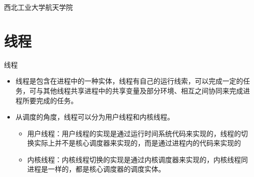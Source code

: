 

\def\lecturename{嵌入式技术}

\title{\insertlecture}

\author{邢超}

\institute
{
  西北工业大学航天学院
}


\subtitle{GNU/Linux 线程}
\date{2015}



\begin{frame}
  \maketitle
\end{frame}



\section{线程}
\begin{frame}{线程}
\begin{itemize}
\item 线程是包含在进程中的一种实体，线程有自己的运行线索，可以完成一定的任务，可与其他线程共享进程中的共享变量及部分环境、相互之间协同来完成进程所要完成的任务。
\item 从调度的角度，线程可以分为用户线程和内核线程。
     \begin{itemize}
     \item 用户线程：用户线程的实现是通过运行时间系统代码来实现的，线程的切换实际上并不是核心调度器来实现的，而是通过进程内的代码来实现的
     \item 内核线程：内核线程切换的实现是通过内核调度器来实现的，内核线程同进程是一样的，都是核心调度器的调度实体。
     \end{itemize}
\end{itemize}
\end{frame}


